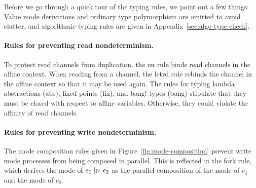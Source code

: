 \begin{comment}
To summarize, it maintains these invariants to ensure that \emph{well-typed ILC
programs are expressible as ITMs}:
\begin{itemize}[leftmargin=*]
  \item No duplication of read channel ends.
  \item No parallel composition of write mode processes.
\end{itemize}
\end{comment}

Before we go through a quick tour of the typing rules, we point out a few
things: Value mode derivations and ordinary type polymorphism are omitted to
avoid clutter, and algorithmic typing rules are given in
Appendix~\ref{sec:algo-type-check}.

\paragraph{Rules for preventing read nondeterminism.}
To protect read channels from duplication, the nu rule binds read channels in
the affine context. When reading from a channel, the letrd rule rebinds the
channel in the affine context so that it may be used again. The rules for typing
lambda abstractions (abs), fixed points (fix), and bang! types (bang) stipulate
that they must be closed with respect to affine variables. Otherwise, they could
violate the affinity of read channels.\smallskip

\paragraph{Rules for preventing write nondeterminism.}
The mode composition rules given in Figure~\ref{fig:mode-composition} prevent
write mode processes from being composed in parallel. This is reflected in the
fork rule, which derives the mode of $e_1 \mathrel{|\rhd} e_2$ as the parallel
composition of the mode of $e_1$ and the mode of $e_2$.


